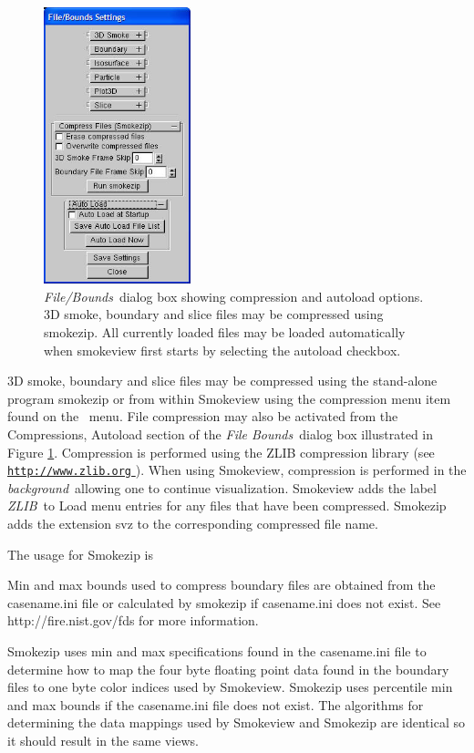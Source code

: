 \documentclass[11pt,twoside]{book}
\newcommand{\figoptions}{hbp}
\newcommand{\hhref}[1]{\href{#1}{{\tt #1}
}}
\newcommand{\frameit}[1]{\fbox{\tt #1}}
\begin{document}
\begin{figure}[\figoptions]
\centerline{\includegraphics[width=1.6736in]{figures/figBOUND1} }
\caption[{\em Compress Files}\ and {\em Autoload}\ dialog box.] {{\em File/Bounds}\ dialog
box showing compression and autoload options.  3D smoke,  boundary and slice
files may be compressed using smokezip.  All currently loaded
files may be loaded automatically when smokeview first starts by
selecting the autoload checkbox.} \label{figBOUNDScompress}
\end{figure}

3D smoke, boundary and slice files may be compressed using the
stand-alone program smokezip or from within Smokeview using the
compression menu item found on the \frameit{Load/Unload}\ menu.  File
compression may also be activated from the Compressions, Autoload
section of the {\em File Bounds}\ dialog box illustrated in Figure
\ref{figBOUNDScompress}. Compression is performed using the ZLIB
compression library (see \hhref{http://www.zlib.org}). When using
Smokeview, compression is performed in the {\em background}\
allowing one to continue visualization.  Smokeview adds the label
{\em ZLIB}\ to Load menu entries for any files that have been
compressed. Smokezip adds the extension svz to the corresponding
compressed file name.

The usage for Smokezip is
{
\scriptsize

}

Min and max bounds used to compress boundary files are obtained
from the casename.ini file or calculated by smokezip if casename.ini
does not exist.  See http://fire.nist.gov/fds for more information.

Smokezip uses min and max specifications found in the casename.ini
file to determine how to map the four byte floating point data
found in the boundary files to one byte color indices used by
Smokeview. Smokezip uses percentile min and max bounds if the
casename.ini file does not exist. The algorithms for determining
the data mappings used by Smokeview and Smokezip are identical so it
should result in the same views.
\end{document}
